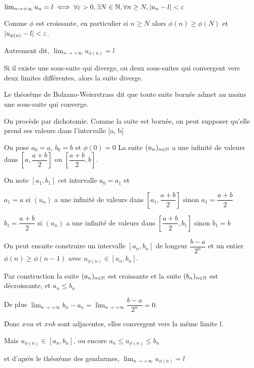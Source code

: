 \documentclass[a4paper, 12pt]{article}
\begin{document}
\begin{demonstration}
    $\lim_{n \to +\infty}u_n = l \iff \forall \varepsilon > 0, \exists N \in \mathbb{N}, \forall n \geq N, |u_n - l| < \varepsilon$

    Comme $\phi$ est croissante, en particulier si $n \geq N$ alors $\phi(n) \geq \phi(N)$ et $|u_{\phi(n)}-l| < \varepsilon$.

    Autrement dit, $\lim_{n \to +\infty} u_{\phi(n)} = l$
\end{demonstration}

\begin{corollaire}
    Si il existe une sous-suite qui diverge, ou deux sous-suites qui convergent vers
    deux limites différentes, alors la suite diverge.
\end{corollaire}

\begin{theorem}
    Le théorème de Bolzano-Weierstrass dit que toute suite bornée admet au moins une sous-suite qui converge.
\end{theorem}

\begin{demonstration}
    On procède par dichotomie. Comme la suite est bornée, on peut supposer qu'elle
    prend ses valeurs dans l'intervalle [a, b]

    On pose $a_0 = a$, $b_0 = b$ et $\phi(0) = 0$
    La suite $(u_n)_{n \in \mathbb{N}}$ a une infinité de valeurs dans $[a, \dfrac{a+b}{2}]$ ou $[\dfrac{a+b}{2}, b]$.

    On note $[a_1, b_1]$ cet intervalle
    $a_0 = a_1$ et
    
    $a_1 = a$ si $(u_n)$ a une infinité de valeurs dans $[a_1, \dfrac{a+b}{2}]$ sinon $a_1 = \dfrac{a+b}{2}$

    $b_1 = \dfrac{a+b}{2}$ si $(u_n)$ a une infinité de valeurs dans $[\dfrac{a+b}{2}, b_1]$ sinon $b_1 = b$

    On peut ensuite construire un intervalle $[a_n, b_n]$ de longeur $\dfrac{b - a}{2^n}$
    et un entier $\phi(n) \geq \phi(n-1)$ avec $u_{\phi(n)} \in [a_n, b_n]$.

    Par construction la suite $(a_n)_{n \in \mathbb{N}}$ est croissante et la suite $(b_n)_{n \in \mathbb{N}}$ est décroissante,
    et $a_n \leq b_n$

    De plus $\lim_{n \to +\infty}b_n - a_n = \lim_{n \to +\infty} \dfrac{b-a}{2^n} = 0$.

    Donc $xn{a}$ et $xn{b}$ sont adjacentes, elles convergent vers la même limite l.

    Mais $u_{\phi(n)} \in [a_n, b_n]$, ou encore $a_n \leq u_{\phi(n)} \leq b_n$

    et d'après le théorème des gendarmes, $\lim_{n \to +\infty}u_{\phi(n)} = l$
\end{demonstration}
\end{document}
